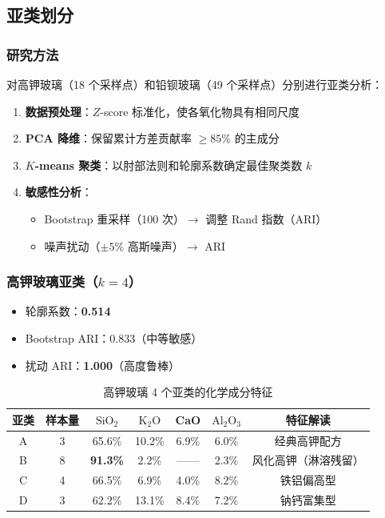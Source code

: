 \subsection{亚类划分}

\subsubsection{研究方法}

对高钾玻璃（18 个采样点）和铅钡玻璃（49 个采样点）分别进行亚类分析：

\begin{enumerate}[label=(\arabic*)]
    \item \textbf{数据预处理}：$Z$-score 标准化，使各氧化物具有相同尺度
    \item \textbf{PCA 降维}：保留累计方差贡献率 $\geq 85\%$ 的主成分
    \item \textbf{$K$-means 聚类}：以肘部法则和轮廓系数确定最佳聚类数 $k$
    \item \textbf{敏感性分析}：
    \begin{itemize}
        \item Bootstrap 重采样（100 次）$\rightarrow$ 调整 Rand 指数（ARI）
        \item 噪声扰动（$\pm 5\%$ 高斯噪声）$\rightarrow$ ARI
    \end{itemize}
\end{enumerate}

\subsubsection{高钾玻璃亚类（$k = 4$）}

\begin{itemize}
    \item 轮廓系数：\textbf{0.514}
    \item Bootstrap ARI：0.833（中等敏感）
    \item 扰动 ARI：\textbf{1.000}（高度鲁棒）
\end{itemize}

\begin{table}[H]
    \centering
    \caption{高钾玻璃 4 个亚类的化学成分特征}
    \label{tab:hk_subclass}
    \begin{tabular}{c c c c c c c}
        \toprule
        \textbf{亚类} & \textbf{样本量} & \textbf{$\text{SiO}_2$} & \textbf{$\text{K}_2\text{O}$} & \textbf{CaO} & \textbf{$\text{Al}_2\text{O}_3$} & \textbf{特征解读} \\
        \midrule
        A & 3 & 65.6\% & 10.2\% & 6.9\% & 6.0\% & 经典高钾配方 \\
        B & 8 & \textbf{91.3\%} & 2.2\% & —— & 2.3\% & 风化高钾（淋溶残留） \\
        C & 4 & 66.5\% & 6.9\% & 4.0\% & 8.2\% & 铁铝偏高型 \\
        D & 3 & 62.2\% & 13.1\% & 8.4\% & 7.2\% & 钠钙富集型 \\
        \bottomrule
    \end{tabular}
\end{table}

